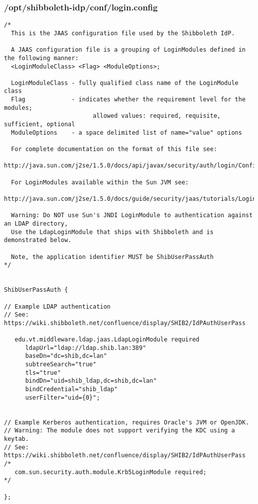 \subsubsection{/opt/shibboleth-idp/conf/login.config}
\begin{lstlisting}
/*
  This is the JAAS configuration file used by the Shibboleth IdP.
  
  A JAAS configuration file is a grouping of LoginModules defined in the following manner:
  <LoginModuleClass> <Flag> <ModuleOptions>;
  
  LoginModuleClass - fully qualified class name of the LoginModule class
  Flag             - indicates whether the requirement level for the modules; 
                         allowed values: required, requisite, sufficient, optional
  ModuleOptions    - a space delimited list of name="value" options
  
  For complete documentation on the format of this file see:
  http://java.sun.com/j2se/1.5.0/docs/api/javax/security/auth/login/Configuration.html
  
  For LoginModules available within the Sun JVM see:
  http://java.sun.com/j2se/1.5.0/docs/guide/security/jaas/tutorials/LoginConfigFile.html
  
  Warning: Do NOT use Sun's JNDI LoginModule to authentication against an LDAP directory,
  Use the LdapLoginModule that ships with Shibboleth and is demonstrated below.

  Note, the application identifier MUST be ShibUserPassAuth
*/


ShibUserPassAuth {

// Example LDAP authentication
// See: https://wiki.shibboleth.net/confluence/display/SHIB2/IdPAuthUserPass

   edu.vt.middleware.ldap.jaas.LdapLoginModule required
      ldapUrl="ldap://ldap.shib.lan:389"
      baseDn="dc=shib,dc=lan"
      subtreeSearch="true"
      tls="true"
      bindDn="uid=shib_ldap,dc=shib,dc=lan"
      bindCredential="shib_ldap"
      userFilter="uid={0}";


// Example Kerberos authentication, requires Oracle's JVM or OpenJDK.
// Warning: The module does not support verifying the KDC using a keytab.
// See: https://wiki.shibboleth.net/confluence/display/SHIB2/IdPAuthUserPass
/*
   com.sun.security.auth.module.Krb5LoginModule required;
*/

};
\end{lstlisting}


